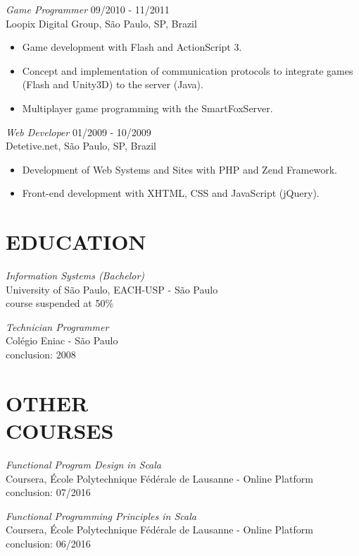 \documentclass[line,margin]{res}
\begin{document}
\begin{resume}
                {\sl Game Programmer} \hfill 09/2010 - 11/2011 \\
                Loopix Digital Group, São Paulo, SP, Brazil
                 \begin{itemize}  \itemsep 1.25pt
                 \item Game development with Flash and ActionScript 3.
                 \item Concept and implementation of communication protocols to integrate games (Flash and Unity3D) to the server (Java).
                 \item Multiplayer game programming with the SmartFoxServer.
                 \end{itemize}
 
                {\sl Web Developer} \hfill 01/2009 - 10/2009 \\
                Detetive.net, São Paulo, SP, Brazil
                 \begin{itemize}  \itemsep 1.25pt
                 \item Development of Web Systems and Sites with PHP and Zend Framework.
                 \item Front-end development with XHTML, CSS and JavaScript (jQuery).
                 \end{itemize} 

\section{EDUCATION} {\sl Information Systems (Bachelor)} \\
                University of São Paulo, EACH-USP - São Paulo \\
                course suspended at 50\%
		
			{\sl Technician Programmer} \\
	                Colégio Eniac - São Paulo \\
	                conclusion: 2008
                
\section{OTHER \\ COURSES}   
           {\sl Functional Program Design in Scala} \\
			Coursera, École Polytechnique Fédérale de Lausanne - Online Platform \\
			conclusion: 07/2016
			
           {\sl Functional Programming Principles in Scala} \\
			Coursera, École Polytechnique Fédérale de Lausanne - Online Platform \\
			conclusion: 06/2016
			

\end{resume}
\end{document}
